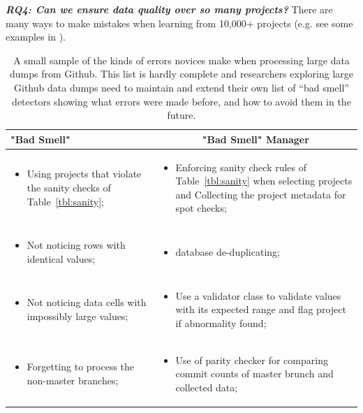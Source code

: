 \noindent\textit{\textbf{RQ4: Can we ensure data quality over so many projects?}}  There are many ways to make mistakes when learning from 10,000+ projects
(e.g. see some examples  in ).
\begin{table}[!t]
\caption{A small sample of the kinds of errors novices make when processing large data dumps from Github. This list is hardly complete and researchers exploring large Github data dumps need to maintain and extend their own list of ``bad smell'' detectors showing what errors were made before, and how to avoid them in the future. }\label{tbl:ohshit}
{\small \begin{tabular}{|p{.45\linewidth}p{.50\linewidth}|}\hline
\rowcolor{blue!10}
\centering \textbf{"Bad Smell"} & \multicolumn{1}{c}{\textbf{"Bad Smell" Manager}} \\ \hline
\rowcolor{white!10}
  \begin{itemize} 
\item
Using projects that violate the sanity checks of Table~\ref{tbl:sanity};
\end{itemize} &   \begin{itemize} 
\item
Enforcing sanity check rules of Table~\ref{tbl:sanity} when selecting projects and  Collecting the project metadata for spot checks;
\end{itemize} \\

\rowcolor{blue!10}
\small \begin{itemize} 
\item
Not noticing rows with identical values;
\end{itemize} & \begin{itemize} 
\item
database de-duplicating;
\end{itemize} \\

\rowcolor{white!10}
\small \begin{itemize} 
\item
Not noticing  data cells with impossibly large values;
\end{itemize} & \begin{itemize} 
\item
Use a validator class to validate values with its expected range and flag project if abnormality found;
\end{itemize} \\

\rowcolor{blue!10}
\small \begin{itemize} 
\item
Forgetting to process the non-master branches;
\end{itemize} & \begin{itemize} 
\item
Use of parity checker for comparing commit counts of master brunch and collected data;
\end{itemize} \\


\end{tabular}}
\end{table}
